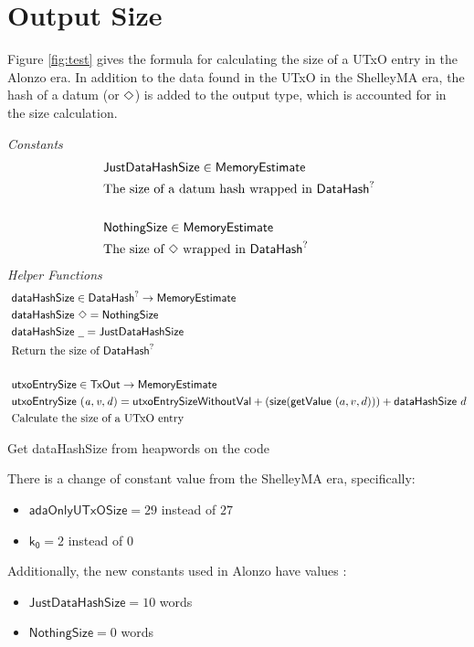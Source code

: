 \section{Output Size}
\label{sec:value-size}

Figure \ref{fig:test} gives the formula for calculating the size of a UTxO entry
in the Alonzo era. In addition to the data found in the UTxO in the ShelleyMA
era, the hash of a datum (or $\Diamond$) is added to the output type, which
is accounted for in the size calculation.

\begin{figure*}[h]
  \emph{Constants}
  \begin{align*}
  & \mathsf{JustDataHashSize} \in \mathsf{MemoryEstimate} \\
  & \text{The size of a datum hash wrapped in $\mathsf{DataHash}^?$} \\~
  \\
  & \mathsf{NothingSize} \in \mathsf{MemoryEstimate} \\
  & \text{The size of $\Diamond$ wrapped in $\mathsf{DataHash}^?$}
  \end{align*}
  \emph{Helper Functions}
  \begin{align*}
    & \fun{dataHashSize} \in \DataHash^? \to \MemoryEstimate \\
    & \fun{dataHashSize}~ \Nothing = \mathsf{NothingSize} \\
    & \fun{dataHashSize}~ \wcard = \mathsf{JustDataHashSize} \\
    & \text{Return the size of $\DataHash^?$} \\~\\
    & \fun{utxoEntrySize} \in \TxOut \to \MemoryEstimate \\
    & \fun{utxoEntrySize}~\var{(a, v, d)} = \mathsf{utxoEntrySizeWithoutVal} + (\fun{size} (\fun{getValue}~(a, v, d))) + \mathsf{dataHashSize}~d \\
    & \text{Calculate the size of a UTxO entry}
  \end{align*}
  \caption{Value Size}
  \label{fig:test}
\end{figure*}

\begin{note}
  Get dataHashSize from heapwords on the code
\end{note}

There is a change of constant value from the ShelleyMA era, specifically:

\begin{itemize}
  \item $\mathsf{adaOnlyUTxOSize} = 29$ instead of $27$
  \item $\mathsf{k_0} = 2$ instead of $0$
\end{itemize}

Additionally, the new constants used in Alonzo have values :

\begin{itemize}
  \item $\mathsf{JustDataHashSize} = 10$ words
  \item $\mathsf{NothingSize} = 0$ words
\end{itemize}
